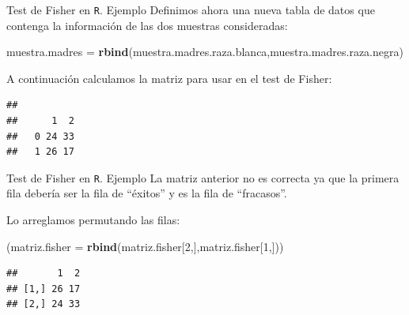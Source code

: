 \documentclass[
  ignorenonframetext,
]{beamer}
\newenvironment{Shaded}{\begin{snugshade}}{\end{snugshade}}
\newcommand{\DataTypeTok}[1]{\textcolor[rgb]{0.13,0.29,0.53}{#1}}
\newcommand{\DecValTok}[1]{\textcolor[rgb]{0.00,0.00,0.81}{#1}}
\newcommand{\KeywordTok}[1]{\textcolor[rgb]{0.13,0.29,0.53}{\textbf{#1}}}
\newcommand{\NormalTok}[1]{#1}
\newcommand{\OperatorTok}[1]{\textcolor[rgb]{0.81,0.36,0.00}{\textbf{#1}}}
\newcommand{\StringTok}[1]{\textcolor[rgb]{0.31,0.60,0.02}{#1}}
\begin{document}
\begin{frame}[fragile]{Test de Fisher en \texttt{R}. Ejemplo}
\protect\hypertarget{test-de-fisher-en-r.-ejemplo-1}{}
Definimos ahora una nueva tabla de datos que contenga la información de
las dos muestras consideradas:

\begin{Shaded}
\begin{Highlighting}[]
\NormalTok{muestra.madres =}\StringTok{ }\KeywordTok{rbind}\NormalTok{(muestra.madres.raza.blanca,muestra.madres.raza.negra)}
\end{Highlighting}
\end{Shaded}

A continuación calculamos la matriz para usar en el test de Fisher:

\begin{Shaded}
\end{Shaded}

\begin{verbatim}
##    
##      1  2
##   0 24 33
##   1 26 17
\end{verbatim}
\end{frame}

\begin{frame}[fragile]{Test de Fisher en \texttt{R}. Ejemplo}
\protect\hypertarget{test-de-fisher-en-r.-ejemplo-2}{}
La matriz anterior no es correcta ya que la primera fila debería ser la
fila de ``éxitos'' y es la fila de ``fracasos''.

Lo arreglamos permutando las filas:

\begin{Shaded}
\begin{Highlighting}[]
\NormalTok{(}\DataTypeTok{matriz.fisher =} \KeywordTok{rbind}\NormalTok{(matriz.fisher[}\DecValTok{2}\NormalTok{,],matriz.fisher[}\DecValTok{1}\NormalTok{,]))}
\end{Highlighting}
\end{Shaded}

\begin{verbatim}
##       1  2
## [1,] 26 17
## [2,] 24 33
\end{verbatim}
\end{frame}
\end{document}
